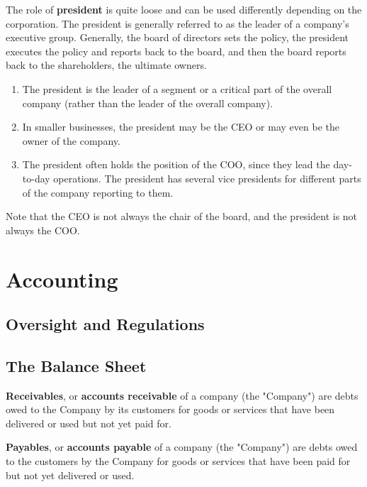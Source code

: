 \documentclass{article}
\begin{document}
    \begin{definition}[President]
      The role of \textbf{president} is quite loose and can be used differently depending on the corporation. The president is generally referred to as the leader of a company's executive group. Generally, the board of directors sets the policy, the president executes the policy and reports back to the board, and then the board reports back to the shareholders, the ultimate owners. 
      \begin{enumerate}
          \item The president is the leader of a segment or a critical part of the overall company (rather than the leader of the overall company). 
          \item In smaller businesses, the president may be the CEO or may even be the owner of the company. 
          \item The president often holds the position of the COO, since they lead the day-to-day operations. The president has several vice presidents for different parts of the company reporting to them. 
      \end{enumerate}
    \end{definition}

    Note that the CEO is not always the chair of the board, and the president is not always the COO. 

\section{Accounting} 

  \subsection{Oversight and Regulations}

  \subsection{The Balance Sheet}

    \begin{definition}
      \textbf{Receivables}, or \textbf{accounts receivable} of a company (the "Company") are debts owed to the Company by its customers for goods or services that have been delivered or used but not yet paid for. 

      \textbf{Payables}, or \textbf{accounts payable} of a company (the "Company") are debts owed to the customers by the Company for goods or services that have been paid for but not yet delivered or used. 
    \end{definition}
\end{document}
